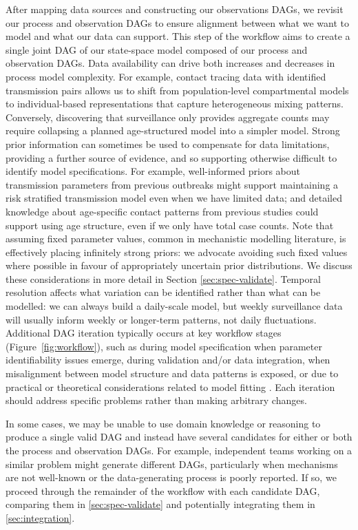 \documentclass{article}
\begin{document}
After mapping data sources and constructing our observations \ac{DAG}s, we revisit our process and observation \ac{DAG}s to ensure alignment between what we want to model and what our data can support.
This step of the workflow aims to create a single joint \ac{DAG} of our state-space model composed of our process and observation \ac{DAG}s.
Data availability can drive both increases and decreases in process model complexity.
For example, contact tracing data with identified transmission pairs allows us to shift from population-level compartmental models to individual-based representations that capture heterogeneous mixing patterns.
Conversely, discovering that surveillance only provides aggregate counts may require collapsing a planned age-structured model into a simpler model.
Strong prior information can sometimes be used to compensate for data limitations, providing a further source of evidence, and so supporting otherwise difficult to identify model specifications.
For example, well-informed priors about transmission parameters from previous outbreaks might support maintaining a risk stratified transmission model even when we have limited data; and detailed knowledge about age-specific contact patterns from previous studies could support using age structure, even if we only have total case counts.
Note that assuming fixed parameter values, common in mechanistic modelling literature, is effectively placing infinitely strong priors: we advocate avoiding such fixed values where possible in favour of appropriately uncertain prior distributions.
We discuss these considerations in more detail in Section \ref{sec:spec-validate}.
Temporal resolution affects what variation can be identified rather than what can be modelled: we can always build a daily-scale model, but weekly surveillance data will usually inform weekly or longer-term patterns, not daily fluctuations.
Additional \ac{DAG} iteration typically occurs at key workflow stages (Figure~\ref{fig:workflow}), such as during model specification when parameter identifiability issues emerge, during validation and/or data integration, when misalignment between model structure and data patterns is exposed, or due to practical or theoretical considerations related to model fitting \citep{corbella2022inferring}.
Each iteration should address specific problems rather than making arbitrary changes.

In some cases, we may be unable to use domain knowledge or reasoning to produce a single valid DAG and instead have several candidates for either or both the process and observation \ac{DAG}s. For example, independent teams working on a similar problem might generate different \ac{DAG}s, particularly when mechanisms are not well-known or the data-generating process is poorly reported. If so, we proceed through the remainder of the workflow with each candidate \ac{DAG}, comparing them in \ref{sec:spec-validate} and potentially integrating them in \ref{sec:integration}.
\end{document}
